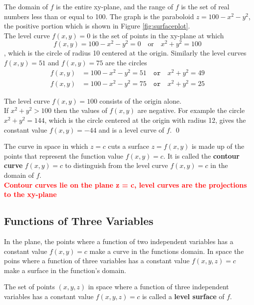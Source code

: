 \documentclass[12pt,a4paper]{article}
\newenvironment{definition}{\begin{definitionbox}}{\end{definitionbox}\vspace{1\baselineskip}}
\begin{document}
\begin{solution}
    The domain of \(f\) is the entire xy-plane, and the range of \(f\) is the set of real numbers less than or equal to 100. The graph is the paraboloid \(z = 100 - x^2 - y^2\), the positive portion which is shown in Figure \ref{fig:surfaceplot}. \\
    The level curve \(f(x,y) = 0\) is the set of points in the xy-plane at which
    \[f(x,y) = 100 - x^2 - y^2 = 0 \quad \text{or} \quad x^2 + y^2 =100\],
    which is the circle of radius 10 centered at the origin. Similarly the level curves \(f(x,y) = 51\) and \(f(x,y) = 75\) are the circles
    \begin{align*}
        f(x,y) &= 100 - x^2 - y^2 = 51 \quad \mathtt{or}  \quad x^2 + y^2 = 49 \\
        f(x,y) &= 100 - x^2 - y^2 = 75  \quad \mathtt{or}  \quad x^2 + y^2 = 25
    \end{align*}
    
    The level curve \(f(x,y) = 100\) consists of the origin alone. \\
    If \(x^2 + y^2 > 100\) then the values of \(f(x,y)\) are negative. For example the circle \(x^2 + y^2 = 144\), which is the circle centered at the origin with radius 12, gives the constant value \(f(x,y) = -44\) and is a level curve of \(f\). \hfill \qed

    The curve in space in which \(z = c\) cuts a surface \(z = f(x,y)\) is made up of the points that represent the function value \(f(x,y) = c\). It is called the \textbf{contour curve} \(f(x,y) =c\) to distinguish from the level curve \(f(x,y) =c\) in the domain of \(f\). \\
    \textcolor{red}{\textbf{Contour curves lie on the plane z = c, level curves are the projections to the xy-plane}}

\end{solution}

\newpage
\subsection{Functions of Three Variables}

In the plane, the points where a function of two independent variables has a constant value \(f(x,y) =c\) make a curve in the functions domain. In space the poins where a function of three variables has a constant value \(f(x,y,z) =c\) make a surface in the function's domain.

\begin{definition}
    The set of points \((x,y,z)\) in space where a function of three independent variables has a constant value \(f(x,y,z) =c\) is called a \textbf{level surface} of \(f\).
\end{definition}
\end{document}
